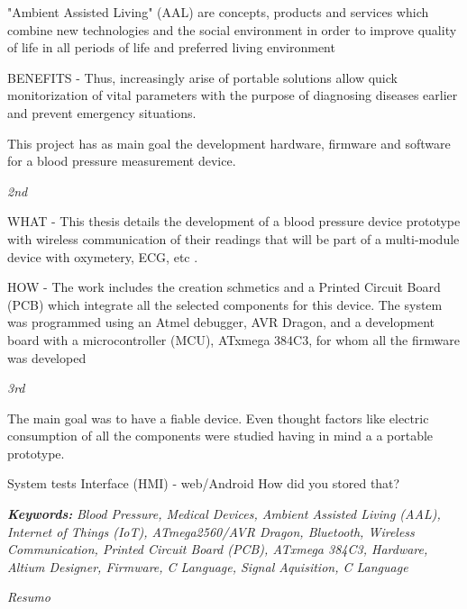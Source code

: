 \documentclass[11pt, oneside]{Thesis} %
\begin{document}
"Ambient Assisted Living" (AAL) are concepts, products and services which combine new technologies and the social environment in order to improve quality of life in all periods of life and preferred living environment

BENEFITS - Thus, increasingly arise  of portable solutions allow quick monitorization of vital parameters with the purpose of diagnosing diseases earlier and prevent emergency situations.

This project has as main goal the development hardware, firmware and software for a blood pressure measurement device.

\textit{\Large 2nd}

WHAT - This thesis details the development of a  blood pressure device prototype with wireless communication of their readings that will be part of a multi-module device with oxymetery, ECG, etc .
 
HOW - The work includes the creation schmetics and a Printed Circuit Board (PCB) which integrate all the selected components for this device.
The system was programmed using an Atmel debugger, AVR Dragon, and a development board with a microcontroller (MCU), ATxmega 384C3, for whom all the firmware was developed

\textit{\Large{3rd}}

The main goal was to have a fiable device. Even thought factors like electric consumption of all the components were studied having in mind a a portable prototype.

System tests
Interface (HMI) - web/Android
How did you stored that? 

\null
\vfill

\textbf{\emph{Keywords:}} \textit{Blood Pressure, Medical Devices, Ambient Assisted Living
(AAL), Internet of Things (IoT), ATmega2560/AVR Dragon, Bluetooth, Wireless Communication, Printed Circuit Board (PCB), ATxmega 384C3, Hardware, Altium Designer, Firmware, C Language, Signal Aquisition, C Language}

\clearpage %

\thispagestyle{plain}

\begin{center}
 {\huge{\textit{Resumo}} \par}
  \bigskip
\end{center}
\end{document}
